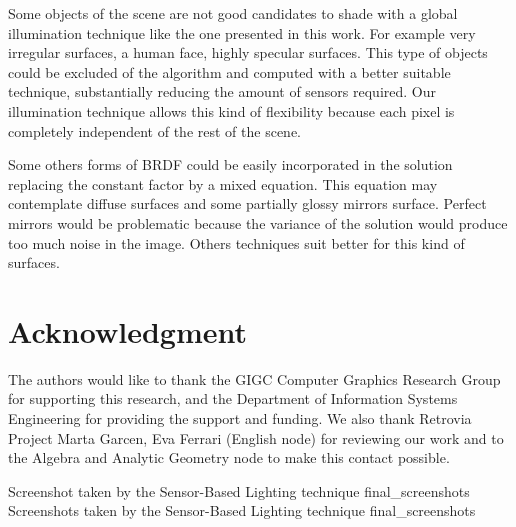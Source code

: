 \documentclass[10pt, conference]{IEEEtran}
\begin{document}
Some objects of the scene are not good candidates to shade with a global illumination technique like the one presented in this work. 
For example very irregular surfaces, a human face, highly specular surfaces.
This type of objects could be excluded of the algorithm and computed with a better suitable technique, substantially reducing the amount of sensors required.
Our illumination technique allows this kind of flexibility because each pixel is completely independent of the rest of the scene.\

Some others forms of BRDF could be easily incorporated in the solution replacing the constant factor by a mixed equation. 
This equation may contemplate diffuse surfaces and some partially glossy mirrors surface. 
Perfect mirrors would be problematic because the variance of the solution would produce too much noise in the image. 
Others techniques suit better for this kind of surfaces.\






\iffinal
\section*{Acknowledgment}
%
The authors would like to thank the GIGC Computer Graphics Research Group for supporting this research, and the Department of Information Systems 
Engineering for providing the support and funding. We also thank Retrovia Project Marta Garcen, Eva Ferrari (English node) for reviewing our work 
and to the Algebra and Analytic Geometry node to make this contact possible.
\fi













\subimages
	{Screenshot taken by the Sensor-Based Lighting technique}
	{final_screenshots}{
}
\subimages
	{Screenshots taken by the Sensor-Based Lighting technique}
	{final_screenshots}{
}
\end{document}
